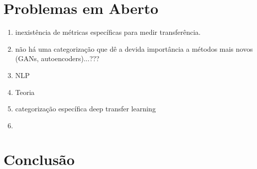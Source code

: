 \documentclass[sigconf]{acmart}
\begin{document}
\section{Problemas em Aberto}\label{emAberto}
\begin{enumerate}
  \item inexistência de métricas específicas para medir transferência.
  \item não há uma categorização que dê a devida importância a métodos mais novos (GANs, autoencoders)...???
  \item NLP
  \item Teoria
  \item categorização específica deep transfer learning
  \item 
\end{enumerate}
\lipsum[3]
\section{Conclusão}\label{conclusao}
\lipsum[3]


\end{document}
